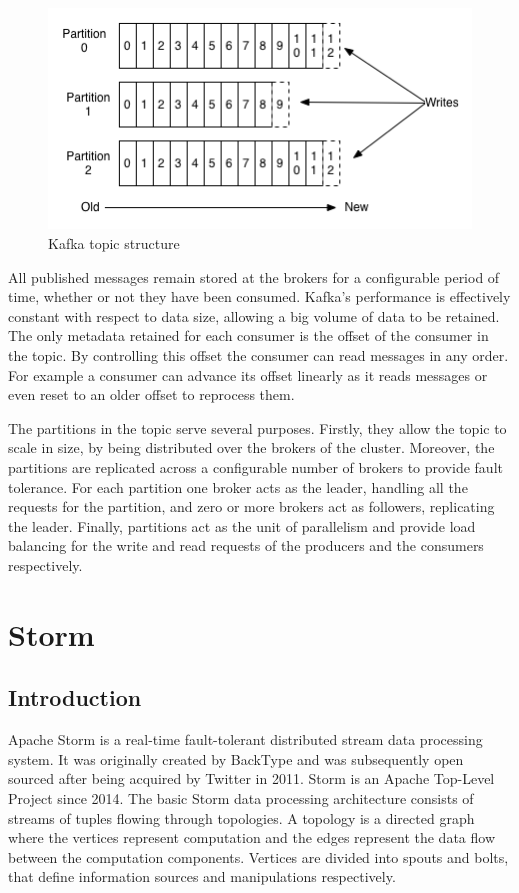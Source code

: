 \begin{figure}[H]
\centering
\includegraphics{figures/kafka_topic}
\caption{Kafka topic structure}
\label{figure:kafka_topic}
\end{figure}

All published messages remain stored at the brokers for a configurable period of time, whether or not they have been consumed. Kafka's performance is effectively constant with respect to data size, allowing a big volume of data to be retained. The only metadata retained for each consumer is the offset of the consumer in the topic. By controlling this offset the consumer can read messages in any order. For example a consumer can advance its offset linearly as it reads messages or even reset to an older offset to reprocess them.

The partitions in the topic serve several purposes. Firstly, they allow the topic to scale in size, by being distributed over the brokers of the cluster. Moreover, the partitions are replicated across a configurable number of brokers to provide fault tolerance. For each partition one broker acts as the leader, handling all the requests for the partition, and zero or more brokers act as followers, replicating the leader. Finally, partitions act as the unit of parallelism and provide load balancing for the write and read requests of the producers and the consumers respectively.


\section{Storm}

\subsection{Introduction}

Apache Storm \cite{storm,storm_website} is a real-time fault-tolerant distributed stream data processing system. It was originally created by BackType and was subsequently open sourced after being acquired by Twitter in 2011. Storm is an Apache Top-Level Project since 2014. The basic Storm data processing architecture consists of streams of tuples flowing through topologies. A topology is a directed graph where the vertices represent computation and the edges represent the data flow between the computation components. Vertices are divided into spouts and bolts, that define information sources and manipulations respectively.

